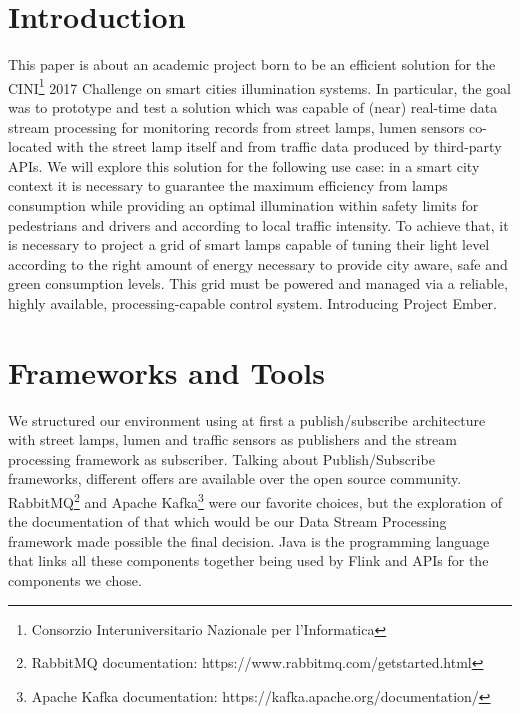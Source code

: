 \section{Introduction}
This paper is about an academic project born to be an efficient solution for the CINI\footnote{Consorzio Interuniversitario Nazionale per l'Informatica} 2017 Challenge on smart cities illumination systems. In particular, the goal was to prototype and test a solution which was capable of (near) real-time data stream processing for monitoring records from street lamps, lumen sensors co-located with the street lamp itself and from traffic data produced by third-party APIs. We will explore this solution for the following use case: in a smart city context it is necessary to guarantee the maximum efficiency from lamps consumption while providing an optimal illumination within safety limits for pedestrians and drivers and according to local traffic intensity. To achieve that, it is necessary to project a grid of smart lamps capable of tuning their light level according to the right amount of energy necessary to provide city aware, safe and green consumption levels. This grid must be powered and managed via a reliable, highly available, processing-capable control system. Introducing Project Ember.

\section{Frameworks and Tools}
We structured our environment using at first a publish/subscribe architecture with street lamps, lumen and traffic sensors as publishers and the stream processing framework as subscriber. Talking about Publish/Subscribe frameworks, different offers are available over the open source community. RabbitMQ\footnote{RabbitMQ documentation: https://www.rabbitmq.com/getstarted.html} and Apache Kafka\footnote{Apache Kafka documentation: https://kafka.apache.org/documentation/} were our favorite choices, but the exploration of the documentation of that which would be our Data Stream Processing framework made possible the final decision.
Java is the programming language that links all these components together being used by Flink and APIs for the components we chose.  

